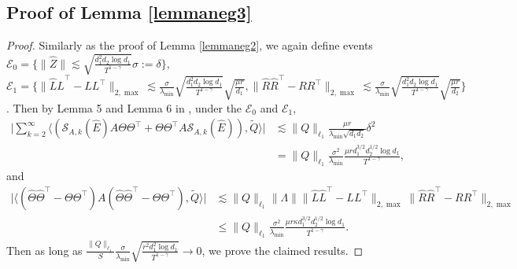 \documentclass[12pt]{article}
\newcommand{\inp}[2]{\langle #1,#2\rangle}
\theoremstyle{plain}
\begin{document}
\subsection{Proof of Lemma \ref{lemmaneg3}}
\begin{proof}
    Similarly as the proof of Lemma \ref{lemmaneg2}, we again define events $\mathcal{E}_0=\{\|\widehat{Z}\|\lesssim \sqrt{\frac{d_1^2d_2\log d_1}{T^{1-\gamma}}}\sigma:=\delta\}$, $\mathcal{E}_1=\{\|\widehat{L}\widehat{L}^{\top}-LL^{\top}\|_{2,\max}\lesssim \frac{\sigma}{\lambda_{\min}}\sqrt{\frac{d_1^2d_2\log d_1}{T^{1-\gamma}}}\sqrt{\frac{\mu r}{d_1}}, \|\widehat{R}\widehat{R}^{\top}-RR^{\top}\|_{2,\max}\lesssim \frac{\sigma}{\lambda_{\min}}\sqrt{\frac{d_1^2d_2\log d_1}{T^{1-\gamma}}}\sqrt{\frac{\mu r}{d_2}}\}$. Then by Lemma 5 and Lemma 6 in \cite{xia2021statistical}, under the $\mathcal{E}_0$ and $\mathcal{E}_1$, 
    \begin{align*}
        \big|\sum_{k=2}^{\infty} \inp{(\mathcal{S}_{A,k}(\widehat{E})A\Theta\Theta^{\top}+\Theta\Theta^{\top}A\mathcal{S}_{A,k}(\widehat{E}))}{\widetilde{Q}}\big|&\lesssim \|Q\|_{\ell_1}\frac{\mu r}{\lambda_{\min}\sqrt{d_1d_2}}\delta^2 \\
        &=\|Q\|_{\ell_1}\frac{\sigma^2}{\lambda_{\min}}\frac{\mu rd_1^{3/2}d_2^{1/2}\log d_1}{T^{1-\gamma}},
    \end{align*}
    and
    \begin{align*}
        \big|\inp{(\widehat{\Theta}\widehat{\Theta}^{\top}-\Theta\Theta^{\top})A(\widehat{\Theta}\widehat{\Theta}^{\top}-\Theta\Theta^{\top})}{\widetilde{Q}}\big|&\lesssim \|Q\|_{\ell_1}\|\Lambda\|\|\widehat{L} \widehat{L}^{\top}-LL^{\top}\|_{2,  { \max }}\|\widehat{R}\widehat{R}^\top- RR^\top\|_{2,\max} \\
        &\leq \|Q\|_{\ell_1}\frac{\sigma^2}{\lambda_{\min}}\frac{\mu r\kappa d_1^{3/2}d_2^{1/2}\log d_1}{T^{1-\gamma}}.
    \end{align*}
    Then as long as $\frac{\|Q\|_{\ell_1}}{S}\frac{\sigma}{\lambda_{\min}}\sqrt{\frac{r^2d_1^2\log d_1}{T^{1-\gamma}}}\rightarrow 0$, we prove the claimed results. 
\end{proof}
\end{document}
